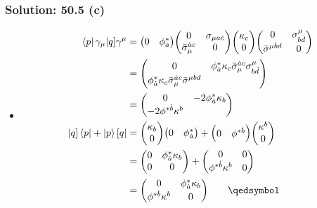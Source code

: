 \documentclass{beamer}
\begin{document}
\begin{frame}
    \frametitle{Solution: 50.5 (c)}
    \begin{itemize}
        \framesubtitle<1>{$-\frac{1}{2}\bra{p}\gamma_\mu|q]\gamma^\mu = |q]\bra{p} + \ket{p}[q|$}
        \item<only@1>
        \begin{align*}
            \bra{p}\gamma_\mu|q]\gamma^\mu &= \mqty(0 & \phi_{\dot{a}}^*)\mqty(0 & \sigma_{\mu a\dot{c}} \\ \bar{\sigma}_{\mu}^{\dot{a}c} & 0)\mqty(\kappa_c \\ 0)\mqty(0 & \sigma_{b\dot{d}}^\mu \\ \bar{\sigma}^{\mu\dot{b}d} & 0) \\
            &= \mqty(0 & \phi_{\dot{a}}^*\kappa_c\bar{\sigma}_\mu^{\dot{a}c}\sigma_{b\dot{d}}^\mu \\ \phi_{\dot{a}}^*\kappa_c\bar{\sigma}_\mu^{\dot{a}c}\bar{\sigma}^{\mu\dot{b}d} ) \\
            &= \mqty(0 & -2\phi_{\dot{a}}^*\kappa_b \\ -2\phi^{*\dot{b}}\kappa^b) \\
            |q]\bra{p} + \ket{p}[q| &= \mqty(\kappa_b \\ 0)\mqty(0 & \phi_{\dot{a}}^*) + \mqty(0 & \phi^{*\dot{b}})\mqty(\kappa^b \\ 0) \\
            &= \mqty(0 & \phi_{\dot{a}}^*\kappa_b \\ 0 & 0) + \mqty(0 & 0 \\ \phi^{*\dot{b}}\kappa^b & 0) \\
            &= \mqty(0 & \phi_{\dot{a}}^*\kappa_b \\ \phi^{*\dot{b}}\kappa^b & 0) \qquad\qedsymbol
        \end{align*}


\end{itemize}
\end{frame}
\end{document}
